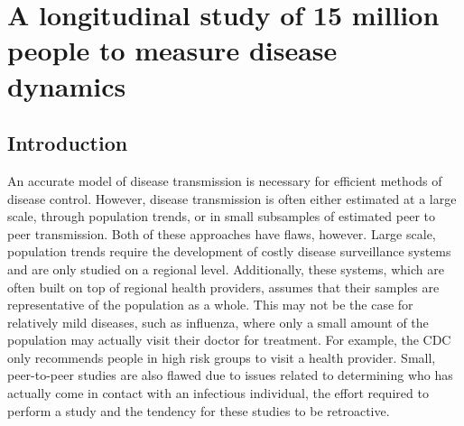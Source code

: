 

\chapter{A longitudinal study of 15 million people to measure disease dynamics}
\label{longitude}

\section{Introduction}



An accurate model of disease transmission is necessary for efficient methods of disease control.\cite{yang2015inference,bilge2014uniqueness,newman2003social,salathe2010high,Smieszek:2013gg,world2006communicable,fraser2004factors,read2013determining,mossong2008social} However, disease transmission is often either estimated at a large scale, through population trends,\cite{yang2015inference,bilge2014uniqueness,diekmann2012mathematical,heesterbeek2002brief} or in small subsamples of estimated peer to peer transmission.\cite{salathe2010high,Smieszek:2013gg,klontz1989outbreak,moser1979outbreak,Cattuto:2010id,liem2005lack} Both of these approaches have flaws, however. Large scale, population trends require the development of costly disease surveillance systems\cite{yang2015inference,world2006communicable} and are only studied on a regional level. Additionally, these systems, which are often built on top of regional health providers, assumes that their samples are representative of the population as a whole. This may not be the case for relatively mild diseases, such as influenza, where only a small amount of the population may actually visit their doctor for treatment. For example, the CDC only recommends people in high risk groups to visit a health provider.\cite{cdcnoflu}  Small, peer-to-peer studies are also flawed due to issues related to determining who has actually come in contact with an infectious individual, the effort required to perform a study and the tendency for these studies to be retroactive.\cite{mossong2008social,salathe2010high,Smieszek:2013gg} 

